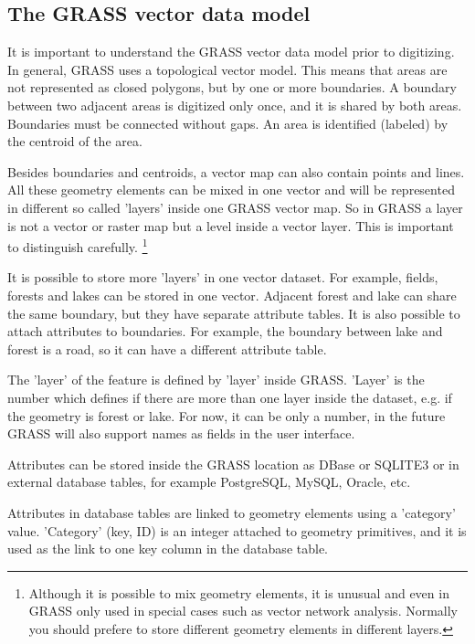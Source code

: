 \subsection{The GRASS vector data model}\label{label_vectmodel}

It is important to understand the GRASS vector data model prior to
digitizing. In general, GRASS uses a topological
vector model. This means that areas are not represented
as closed polygons, but by one or more boundaries. A boundary between two
adjacent areas is digitized only once, and it is shared by both areas.
Boundaries must be connected without gaps. An area is identified (labeled) by the centroid of the area.

Besides boundaries and centroids, a vector map can also contain
points and lines. All these geometry elements can be mixed
in one vector and will be represented in different so called 'layers' inside
one GRASS vector map. So in GRASS a layer is not a vector or raster map but a
level inside a vector layer. This is important to distinguish carefully.
\footnote{Although it
is possible to mix geometry elements, it is unusual and even in GRASS only
used in special cases such as vector network analysis. Normally you should
prefere to store different geometry elements in different layers.}

It is possible to store more 'layers' in one vector dataset. For example,
fields, forests and lakes can be stored in one vector. Adjacent
forest and lake can share the same boundary, but they have separate attribute
tables. It is also possible to attach attributes to boundaries. For example,
the boundary between lake and forest is a road, so it can have a different 
attribute table.
 
The 'layer' of the feature is defined by 'layer' inside GRASS.
'Layer' is the number which defines if there are more than one layer inside the 
dataset, e.g. if the geometry is forest or lake.
For now, it can be only a number, in the future GRASS will also support  
names as fields in the user interface.

Attributes can be stored inside the GRASS location as DBase or SQLITE3 or in
external database tables, for example PostgreSQL, MySQL, Oracle,
etc.

Attributes in database tables are linked to geometry elements using
a 'category' value. 'Category' (key, ID) is an
integer attached to geometry primitives, and it is used as the link to one
key column in the database table.

